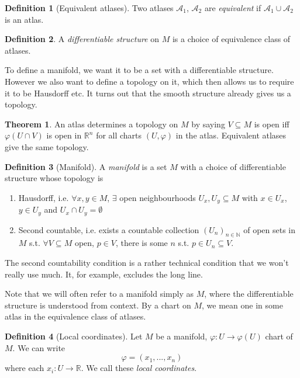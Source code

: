 \documentclass[a4paper,11pt]{article}
\theoremstyle{definition}
\newtheorem*{defn}{Definition}
\newtheorem*{thm}{Theorem}
\numberwithin{equation}{section}
\begin{document}
\begin{defn}[Equivalent atlases]
Two atlases $\mathcal{A}_1$, $\mathcal{A}_2$ are \emph{equivalent} if $\mathcal{A}_1\cup\mathcal{A}_2$ is an atlas.
\end{defn}

\begin{defn}
A \emph{differentiable structure} on $M$ is a choice of equivalence class of atlases.
\end{defn}

To define a manifold, we want it to be a set with a differentiable structure. However we also want to define a topology on it, which then allows us to require it to be Hausdorff etc. It turns out that the smooth structure already gives us a topology.

\begin{thm}
An atlas determines a topology on $M$ by saying $V\subseteq M$ is open iff $\varphi(U\cap V)$ is open in $\mathbb{R}^n$ for all charts $(U,\varphi)$ in the atlas. Equivalent atlases give the same topology.
\end{thm}

\begin{defn}[Manifold]
A \emph{manifold} is a set $M$ with a choice of differentiable structure whose topology is
\begin{enumerate}
    \item Hausdorff, i.e. $\forall x,y\in M$, $\exists$ open neighbourhoods $U_x,U_y\subseteq M$ with $x\in U_x$, $y\in U_y$ and $U_x\cap U_y=\emptyset$
    \item Second countable, i.e. exists a countable collection $(U_n)_{n\in\mathbb{N}}$ of open sets in $M$ s.t. $\forall V\subseteq M$ open, $p\in V$, there is some $n$ s.t. $p\in U_n\subseteq V$.
\end{enumerate}
\end{defn}

The second countability condition is a rather technical condition that we won’t really use much. It, for example, excludes the long line.

Note that we will often refer to a manifold simply as $M$, where the differentiable structure is understood from context. By a chart on $M$, we mean one in some atlas in the equivalence class of atlases.

\begin{defn}[Local coordinates]
Let $M$ be a manifold, $\varphi:U\rightarrow\varphi(U)$ chart of $M$. We can write
\[
\varphi=(x_1,...,x_n)
\]
where each $x_i:U\rightarrow\mathbb{R}$. We call these \emph{local coordinates}.
\end{defn}
\end{document}
